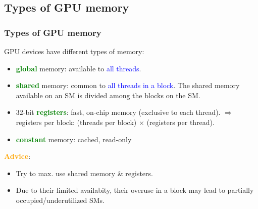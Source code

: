 \subsection{Types of GPU memory}
\begin{frame}
\frametitle{Types of GPU memory} %
GPU devices have different types of memory:
\begin{itemize}
	\item \textbf{\textcolor{green}{global}} memory: available to \textcolor{blue}{all threads}.
	\item \textbf{\textcolor{green}{shared}} memory: common to \textcolor{blue}{all threads in a block}.\newline
        The shared memory available on an SM is divided among the blocks on the SM.	  
   \item $32$-bit \textbf{\textcolor{green}{registers}}: fast, on-chip memory (exclusive to each thread).\newline
	 $\Rightarrow$ registers per block: (threads per block) $\times$ (registers per thread).  
   \item \textbf{\textcolor{green}{constant}} memory: cached, read-only
\end{itemize}
\textbf{\textcolor{orange}{Advice}}: 
\begin{itemize}
   \item Try to max. use shared memory \& registers.
   \item Due to their limited availabity, their overuse in a block
         may lead to partially occupied/underutilized SMs.
\end{itemize}		
\end{frame}

